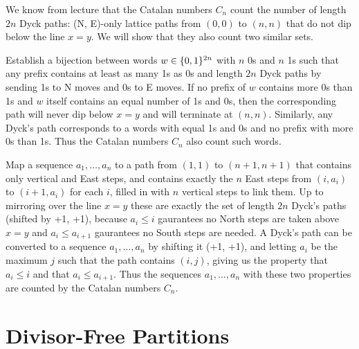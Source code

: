 \documentclass{article}
\begin{document}
We know from lecture that the Catalan numbers $C_n$ count the number of length $2n$ Dyck paths: (N, E)-only lattice paths from $(0, 0)$ to $(n, n)$ that do not dip below the line $x=y$. We will show that they also count two similar sets.
\begin{alphalist}
\item Establish a bijection between words $w \in \{0, 1\}^{2n}$ with $n$ 0s and $n$ 1s such that any prefix contains at least as many 1s as 0s and length $2n$ Dyck paths by sending 1s to N moves and 0s to E moves. If no prefix of $w$ contains more 0s than 1s and $w$ itself contains an equal number of 1s and 0s, then the corresponding path will never dip below $x=y$ and will terminate at $(n, n)$. Similarly, any Dyck's path corresponds to a words with equal 1s and 0s and no prefix with more 0s than 1s. Thus the Catalan numbers $C_n$ also count such words.
\item Map a sequence $a_1, \ldots, a_n$ to a path from $(1, 1)$ to $(n+1, n+1)$ that contains only vertical and East steps, and contains exactly the $n$ East steps from $(i, a_i)$ to $(i+1, a_i)$ for each $i$, filled in with $n$ vertical steps to link them. Up to mirroring over the line $x=y$ these are exactly the set of length $2n$ Dyck's paths (shifted by +1, +1), because $a_i \le i$ gaurantees no North steps are taken above $x=y$ and $a_i \le a_{i+1}$ gaurantees no South steps are needed. A Dyck's path can be converted to a sequence $a_1, \ldots, a_n$ by shifting it (+1, +1), and letting $a_i$ be the maximum $j$ such that the path contains $(i, j)$, giving us the property that $a_i \le i$ and that $a_i \le a_{i+1}$. Thus the sequences $a_1, \ldots, a_n$ with these two properties are counted by the Catalan numbers $C_n$.
\end{alphalist}

\section{Divisor-Free Partitions}
\end{document}
